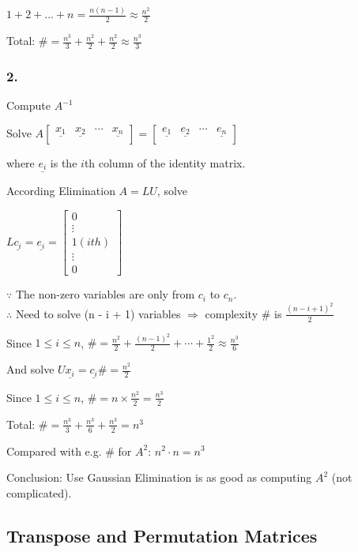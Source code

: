 \documentclass[12pt,a4paper]{article}
\begin{document}
$1 + 2 + \hdots + n = \frac{n(n-1)}{2} \approx \frac{n^2}{2}$

Total: $\# = \frac{n^3}{3} + \frac{n^2}{2} + \frac{n^2}{2} \approx \frac{n^3}{3}$

\subsubsection*{2.}

Compute $A^{-1}$

Solve
$
A
\begin{bmatrix}
  \underline{x_1} & \underline{x_2} & \cdots & \underline{x_n} \\
\end{bmatrix} = 
\begin{bmatrix}
  \underline{e_1} & \underline{e_2} & \cdots & \underline{e_n} \\
\end{bmatrix}
$

where $\underline{e_i}$ is the $i$th column of the identity matrix.

According Elimination $A = LU$, solve

$
L\underline{c_i} = \underline{e_i} = 
\begin{bmatrix}
  0 \\
  \vdots \\
  1 (ith) \\
  \vdots \\
  0
\end{bmatrix}
$

$\because$ The non-zero variables are only from $c_i$ to $c_n$. \\
$\therefore$ Need to solve (n - i + 1) variables $\Rightarrow$ complexity $\#$ is $\frac{(n-i+1)^2}{2}$

Since $1 \leq i \leq n$, $\# = \frac{n^2}{2} + \frac{(n-1)^2}{2} + \cdots + \frac{1^2}{2}  \approx \frac{n^3}{6}$

And solve $U\underline{x_i} = \underline{c_i} \# = \frac{n^2}{2}$

Since $1 \leq i \leq n$, $\# = n \times \frac{n^2}{2} = \frac{n^3}{2}$

Total: $\# = \frac{n^3}{3} + \frac{n^3}{6} + \frac{n^3}{2} = n^3$

Compared with e.g. \# for $A^2$: $n^2 \cdot n = n^3$

Conclusion: Use Gaussian Elimination is as good as computing $A^2$ (not complicated).

\subsection*{Transpose and Permutation Matrices}
\end{document}

